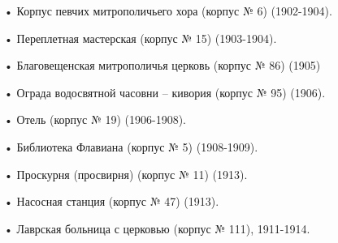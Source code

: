 \noindent • Корпус певчих митрополичьего хора (корпус № 6) (1902-1904).

\noindent • Переплетная мастерская (корпус № 15) (1903-1904).

\noindent • Благовещенская митрополичья церковь (корпус № 86) (1905)

\noindent • Ограда водосвятной часовни – кивория (корпус № 95) (1906).

\noindent • Отель (корпус № 19) (1906-1908).

\noindent • Библиотека Флавиана (корпус № 5) (1908-1909).

\noindent • Проскурня (просвирня) (корпус № 11) (1913).

\noindent • Насосная станция (корпус № 47) (1913).

\noindent • Лаврская больница с церковью (корпус № 111), 1911-1914.
